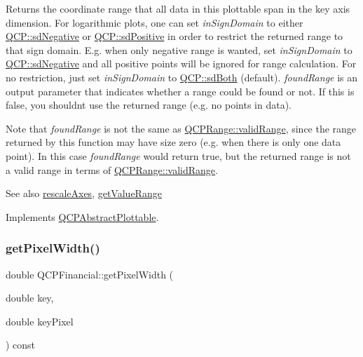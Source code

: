 Returns the coordinate range that all data in this plottable span in the key axis dimension. For logarithmic plots, one can set {\itshape in\+Sign\+Domain} to either \hyperlink{namespace_q_c_p_afd50e7cf431af385614987d8553ff8a9a2d18af0bc58f6528d1e82ce699fe4829}{Q\+C\+P\+::sd\+Negative} or \hyperlink{namespace_q_c_p_afd50e7cf431af385614987d8553ff8a9a584784b75fb816abcc627cf743bb699f}{Q\+C\+P\+::sd\+Positive} in order to restrict the returned range to that sign domain. E.\+g. when only negative range is wanted, set {\itshape in\+Sign\+Domain} to \hyperlink{namespace_q_c_p_afd50e7cf431af385614987d8553ff8a9a2d18af0bc58f6528d1e82ce699fe4829}{Q\+C\+P\+::sd\+Negative} and all positive points will be ignored for range calculation. For no restriction, just set {\itshape in\+Sign\+Domain} to \hyperlink{namespace_q_c_p_afd50e7cf431af385614987d8553ff8a9aa38352ef02d51ddfa4399d9551566e24}{Q\+C\+P\+::sd\+Both} (default). {\itshape found\+Range} is an output parameter that indicates whether a range could be found or not. If this is false, you shouldn\textquotesingle{}t use the returned range (e.\+g. no points in data).

Note that {\itshape found\+Range} is not the same as \hyperlink{class_q_c_p_range_ab38bd4841c77c7bb86c9eea0f142dcc0}{Q\+C\+P\+Range\+::valid\+Range}, since the range returned by this function may have size zero (e.\+g. when there is only one data point). In this case {\itshape found\+Range} would return true, but the returned range is not a valid range in terms of \hyperlink{class_q_c_p_range_ab38bd4841c77c7bb86c9eea0f142dcc0}{Q\+C\+P\+Range\+::valid\+Range}.

\begin{DoxySeeAlso}{See also}
\hyperlink{class_q_c_p_abstract_plottable_a1491c4a606bccd2d09e65e11b79eb882}{rescale\+Axes}, \hyperlink{class_q_c_p_financial_a82d862aa134d78853f98f8c57a03415b}{get\+Value\+Range} 
\end{DoxySeeAlso}


Implements \hyperlink{class_q_c_p_abstract_plottable_a4da16d3cd4b509e1104a9b0275623c96}{Q\+C\+P\+Abstract\+Plottable}.

\mbox{\label{class_q_c_p_financial_a3ff49384a95233140c8205af77c08955}} 
\subsubsection{\texorpdfstring{get\+Pixel\+Width()}{getPixelWidth()}}
{\footnotesize\ttfamily double Q\+C\+P\+Financial\+::get\+Pixel\+Width (\begin{DoxyParamCaption}\item[{double}]{key,  }\item[{double}]{key\+Pixel }\end{DoxyParamCaption}) const\hspace{0.3cm}{\ttfamily [protected]}}


